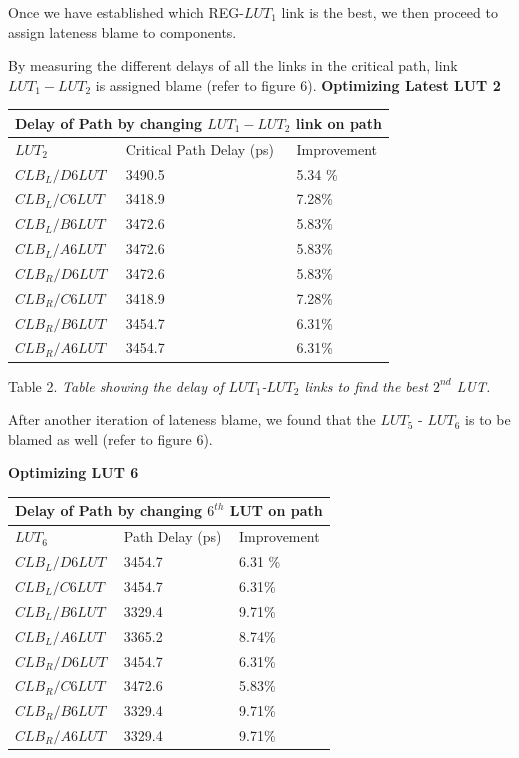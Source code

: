\documentclass[11pt]{report}
\begin{document}
\begin{mainf}
Once we have established which REG-$LUT_1$ link is the best, we then proceed to assign lateness blame to components. 

By measuring the different delays of all the links in the critical path, link $LUT_1-LUT_2$ is assigned blame (refer to figure 6). 
\newpage
\textbf{Optimizing Latest LUT 2}

\begin{tabular}{ |p{4cm}||p{4cm}|p{4cm}|  }
 \hline
 \multicolumn{3}{|c|}{Delay of Path by changing $LUT_1 - LUT_2$ link on path} \\
 \hline
 $LUT_2$& Critical Path Delay (ps)&Improvement\\
 \hline
 $CLB_L/D6LUT $   &   3490.5
 & 5.34 \%\\
 $CLB_L/C6LUT $&   3418.9&7.28\% \\
 $CLB_L/B6LUT $ & 3472.6&5.83\%\\
 $CLB_L/A6LUT $ & 3472.6&5.83\%\\
 $CLB_R/D6LUT $&   3472.6&5.83\%\\
 $CLB_R/C6LUT $&  3418.9&7.28\% \\
 $CLB_R/B6LUT $&  3454.7&6.31\%\\
 $CLB_R/A6LUT $&  3454.7&6.31\%\\
 \hline
\end{tabular}

 Table 2. \textit{Table showing the delay of $LUT_1$-$LUT_2$ links to find the best $2^{nd}$ LUT. }

After another iteration of lateness blame, we found that the $LUT_5$ - $LUT_6$ is to be blamed as well (refer to figure 6). 

\textbf{Optimizing LUT 6}

\begin{tabular}{ |p{3cm}||p{3cm}|p{3cm}|  }
 \hline
 \multicolumn{3}{|c|}{Delay of Path by changing $6^{th}$ LUT on path} \\
 \hline
 $LUT_6$& Path Delay (ps)&Improvement\\
 \hline
 $CLB_L/D6LUT$   &  3454.7
 & 6.31 \%\\
 $CLB_L/C6LUT $&   3454.7&6.31\% \\
 $CLB_L/B6LUT $ & 3329.4&9.71\%\\
 $CLB_L/A6LUT $ &3365.2&8.74\%\\
 $CLB_R/D6LUT $&   3454.7&6.31\%\\
 $CLB_R/C6LUT $&  3472.6&5.83\% \\
 $CLB_R/B6LUT $&  3329.4&9.71\%\\
 $CLB_R/A6LUT $&  3329.4&9.71\%\\
 \hline
\end{tabular}


\end{mainf}
\end{document}
